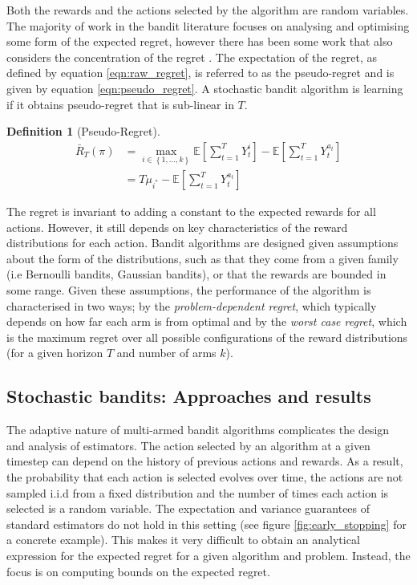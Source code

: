 \documentclass[11pt,a4paper,twoside]{report}
\newcommand{\E}[1]{\mathbb E\left[{#1}\right]}
\newcommand{\set}[1]{\left\{#1\right\}}
\newcommand{\eqn}[1]{\begin{align}#1\end{align}}
\newcommand{\cfb}[2]{{#1}_t^{#2}} %
\newcommand{\regret}{\bar{R}_{T}} %
\theoremstyle{plain}
\theoremstyle{definition}
\newtheorem{definition}[theorem]{Definition}
\begin{document}
Both the rewards and the actions selected by the algorithm are random variables. The majority of work in the bandit literature focuses on analysing and optimising some form of the expected regret, however there has been some work that also considers the concentration of the regret \citep{Auer1995,Audibert2007,Audibert2009exploration}. The expectation of the regret, as defined by equation \ref{eqn:raw_regret}, is referred to as the pseudo-regret \citep{Bubeck2012} and is given by equation \ref{eqn:pseudo_regret}. A stochastic bandit algorithm is learning if it obtains pseudo-regret that is sub-linear in $T$. 

\vspace{0.5cm}
\begin{definition}[Pseudo-Regret]
\eqn{
\label{eqn:pseudo_regret}
\regret(\pi) &= \max_{i \in \set{1,...,k}}\E{\sum_{t=1}^T{\cfb{Y}{i}}} - \E{\sum_{t=1}^T{\cfb{Y}{a_t}}} \\
&= T\mu_{i^*} - \E{\sum_{t=1}^T{\cfb{Y}{a_t}}}
}
\end{definition}

The regret is invariant to adding a constant to the expected rewards for all actions. However, it still depends on key characteristics of the reward distributions for each action. Bandit algorithms are designed given assumptions about the form of the distributions, such as that they come from a given family (i.e Bernoulli bandits, Gaussian bandits), or that the rewards are bounded in some range. Given these assumptions, the performance of the algorithm is characterised in two ways; by the \emph{problem-dependent regret}, which typically depends on how far each arm is from optimal and by the \emph{worst case regret}, which is the maximum regret over all possible configurations of the reward distributions (for a given horizon $T$ and number of arms $k$).

\subsection{Stochastic bandits: Approaches and results}
\label{sec:stochastic-bandit}

The adaptive nature of multi-armed bandit algorithms complicates the design and analysis of estimators. The action selected by an algorithm at a given timestep can depend on the history of previous actions and rewards. As a result, the probability that each action is selected evolves over time, the actions are not sampled i.i.d from a fixed distribution and the number of times each action is selected is a random variable. The expectation and variance guarantees of standard estimators do not hold in this setting (see figure \ref{fig:early_stopping} for a concrete example). This makes it very difficult to  obtain an analytical expression for the expected regret for a given algorithm and problem. Instead, the focus is on computing bounds on the expected regret. 
\end{document}
